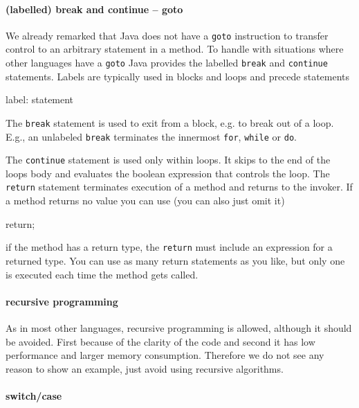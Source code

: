 \paragraph{(labelled) break and continue -- goto}
We already remarked that Java does not have a \verb|goto| instruction
to transfer control to an arbitrary statement in a method. To handle
with situations where other languages have a \verb|goto| Java provides
the labelled \verb|break| and \verb|continue| statements. Labels are
typically used in blocks and loops and precede statements
\begin{sverbatim}
label: statement
\end{sverbatim}
The \verb|break| statement is used to exit from a block, e.g. to break
out of a loop. E.g., an unlabeled \verb|break| terminates the innermost
\verb|for|, \verb|while| or \verb|do|.

The \verb|continue| statement is used only within loops. It skips to
the end of the loops body and evaluates the boolean expression that
controls the loop. The \verb|return| statement terminates execution of
a method and returns to the invoker. If a method returns no value you
can use (you can also just omit it)
\begin{sverbatim}
return;
\end{sverbatim}
if the method has a return type, the \verb|return| must include an
expression for a returned type. You can use as many return statements 
as you like, but only one is executed each time the method gets called.

\paragraph{recursive programming}
As in most other languages, recursive programming is allowed, although
it should be avoided. First because of the clarity of the code
and second it has low performance and larger memory consumption. 
Therefore we do not see any reason to show an example, just
avoid using recursive algorithms.

\paragraph{switch/case}

